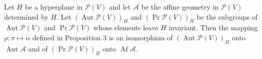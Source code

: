 Let $H$ be a hyperplane in $\mathcal{P}(V)$ and let $\mathcal{A}$ be the affine geometry in $\mathcal{P}(V)$ determined by $H$. Let $(\operatorname{Aut} \mathcal{P}(V))_H$ and $(\operatorname{Pr} \mathcal{P}(V))_H$ be the subgroups of $\operatorname{Aut} \mathcal{P}(V)$ and $\operatorname{Pr} \mathcal{P}(V)$ whose elements leave $H$ invariant. Then the mapping $\rho: \pi \mapsto \alpha$ defined in Proposition 3 is an isomorphism of $(\operatorname{Aut} \mathcal{P}(V))_H$ onto $\operatorname{Aut} \mathcal{A}$ and of $(\operatorname{Pr} \mathcal{P}(V))_H$ onto $\operatorname{Af} \mathcal{A}$.
